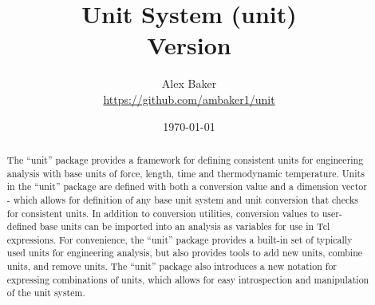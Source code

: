 \documentclass{article}
\title{\Huge Unit System (unit) \\\small Version \version}
\author{Alex Baker\\\small\url{https://github.com/ambaker1/unit}}
\date{\small\today}
\begin{document}
\maketitle
\begin{abstract}
The ``unit'' package provides a framework for defining consistent units for engineering analysis with base units of force, length, time and thermodynamic temperature. 
Units in the ``unit'' package are defined with both a conversion value and a dimension vector - which allows for definition of any base unit system and unit conversion that checks for consistent units. 
In addition to conversion utilities, conversion values to user-defined base units can be imported into an analysis as variables for use in Tcl expressions. 
For convenience, the ``unit'' package provides a built-in set of typically used units for engineering analysis, but also provides tools to add new units, combine units, and remove units. 
The ``unit'' package also introduces a new notation for expressing combinations of units, which allows for easy introspection and manipulation of the unit system. 
\end{abstract}
\clearpage
\end{document}
